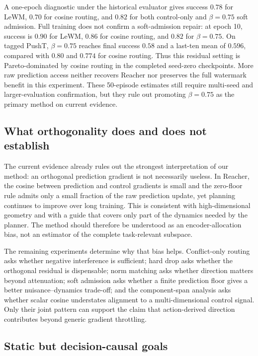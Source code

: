 A one-epoch diagnostic under the historical evaluator gives success $0.78$
for LeWM, $0.70$ for cosine routing, and $0.82$ for both control-only and
$\beta=0.75$ soft admission.  Full training does not confirm a soft-admission
repair: at epoch 10, success is $0.90$ for LeWM, $0.86$ for cosine routing,
and $0.82$ for $\beta=0.75$.  On tagged PushT, $\beta=0.75$ reaches final
success $0.58$ and a last-ten mean of $0.596$, compared with $0.80$ and
$0.774$ for cosine routing.  Thus this residual setting is Pareto-dominated by
cosine routing in the completed seed-zero checkpoints.  More raw prediction
access neither recovers Reacher nor preserves the full watermark benefit in
this experiment.  These 50-episode estimates still require multi-seed and
larger-evaluation confirmation, but they rule out promoting $\beta=0.75$ as
the primary method on current evidence.

\subsection{What orthogonality does and does not establish}

The current evidence already rules out the strongest interpretation of our
method: an orthogonal prediction gradient is not necessarily useless.  In
Reacher, the cosine between prediction and control gradients is small and the
zero-floor rule admits only a small fraction of the raw prediction update, yet
planning continues to improve over long training.  This is consistent with
high-dimensional geometry and with a guide that covers only part of the
dynamics needed by the planner.  The method should therefore be understood as
an encoder-allocation bias, not an estimator of the complete task-relevant
subspace.

The remaining experiments determine why that bias helps.  Conflict-only
routing asks whether negative interference is sufficient; hard drop asks
whether the orthogonal residual is dispensable; norm matching asks whether
direction matters beyond attenuation; soft admission asks whether a finite
prediction floor gives a better nuisance--dynamics trade-off; and the
component-span analysis asks whether scalar cosine understates alignment to a
multi-dimensional control signal.  Only their joint pattern can support the
claim that action-derived direction contributes beyond generic gradient
throttling.

\subsection{Static but decision-causal goals}


